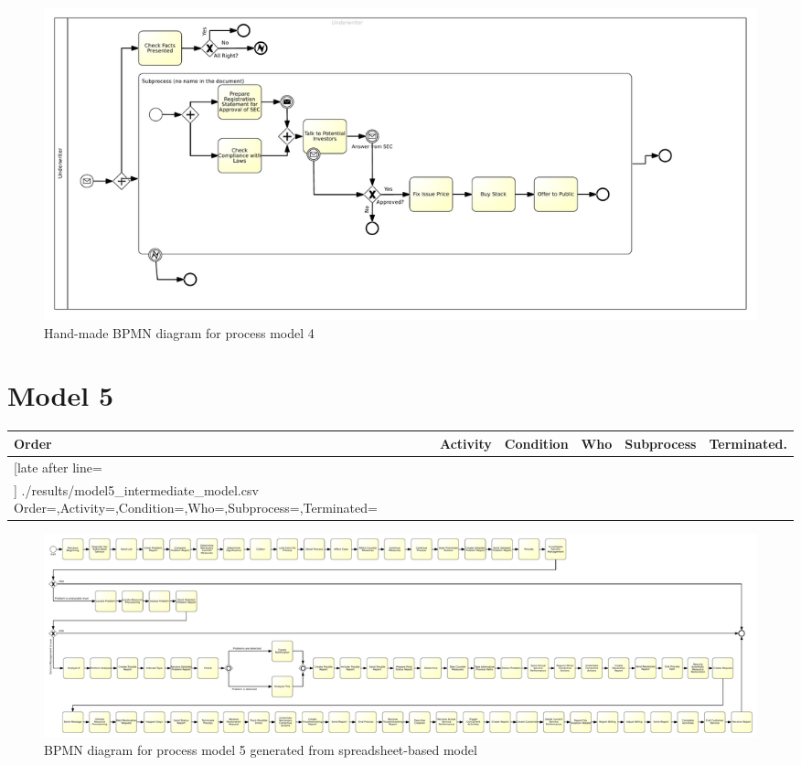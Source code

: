 \begin{figure}[H]
	\centering
	\includegraphics[width=\hsize]{./bpmn/model4.pdf}
	\caption{Hand-made BPMN diagram for process model 4}
	\label{bpmn:model4}
\end{figure}

\section{Model 5}
\begin{tcolorbox}[
	breakable,
	arc=0mm,
	left=1pt,
	right = 1pt,
	boxrule=0mm,
	colback = {white},
	]
	\texttt{}
\end{tcolorbox}
\label{txt:model5}

{\scriptsize
	\begin{longtable}{|p{0.03 \hsize}|p{0.25 \hsize}|p{0.15 \hsize}|p{0.2 \hsize}|p{0.1 \hsize}|p{0.1 \hsize}|}
		\hline
		Order & Activity & Condition & Who & Subprocess & Terminated.
		\\\hline\hline
		\csvreader[late after line=\\\hline]
		{./results/model5_intermediate_model.csv}
		{Order=\Order,Activity=\Activity,Condition=\Condition,Who=\Who,Subprocess=\Subprocess,Terminated=\Terminated}
		{\Order & \Activity & \Condition & \Who & \Subprocess & \Terminated}
		\caption{Spreadsheet-based description for process model 5}
		\label{csv:model5}
	\end{longtable}
}

\begin{figure}[H]
	\centering
	\includegraphics[width=0.95\textheight, angle=90]{./generated_bpmn/model5.pdf}
	\caption{BPMN diagram for process model 5 generated from spreadsheet-based model}
	\label{bpmn:generated_model5}
\end{figure}

